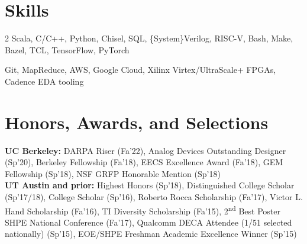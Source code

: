 \documentclass[line]{res}
\begin{document}
\begin{resume}
\section{\Large{Skills}}
\label{sec:skills}
\vspace{1mm}

\begin{multicols}{2}
Scala, C/C++, Python, Chisel, SQL, \{System\}Verilog, RISC-V, Bash, Make, Bazel, TCL, TensorFlow, PyTorch

\columnbreak

Git, MapReduce, AWS, Google Cloud, Xilinx Virtex/UltraScale+ FPGAs, Cadence EDA tooling

\end{multicols}

\vspace{-7mm}


\section{\Large{Honors, Awards, and Selections}}
\label{sec:honors}
\vspace{1.6mm}

\textbf{UC Berkeley:} DARPA Riser (Fa'22), Analog Devices Outstanding Designer (Sp'20), Berkeley Fellowship (Fa'18), EECS Excellence Award (Fa'18), GEM Fellowship (Sp'18), NSF GRFP Honorable Mention (Sp'18) \\
\textbf{UT Austin and prior:} Highest Honors (Sp'18),
Distinguished College Scholar (Sp'17/18),
College Scholar (Sp'16),
Roberto Rocca Scholarship (Fa'17),
Victor L. Hand Scholarship (Fa'16),
TI Diversity Scholarship (Fa'15),
2\textsuperscript{nd} Best Poster SHPE National Conference (Fa'17),
Qualcomm DECA Attendee (1/51 selected nationally) (Sp'15),
EOE/SHPE Freshman Academic Excellence Winner (Sp'15)

\end{resume}
\end{document}
